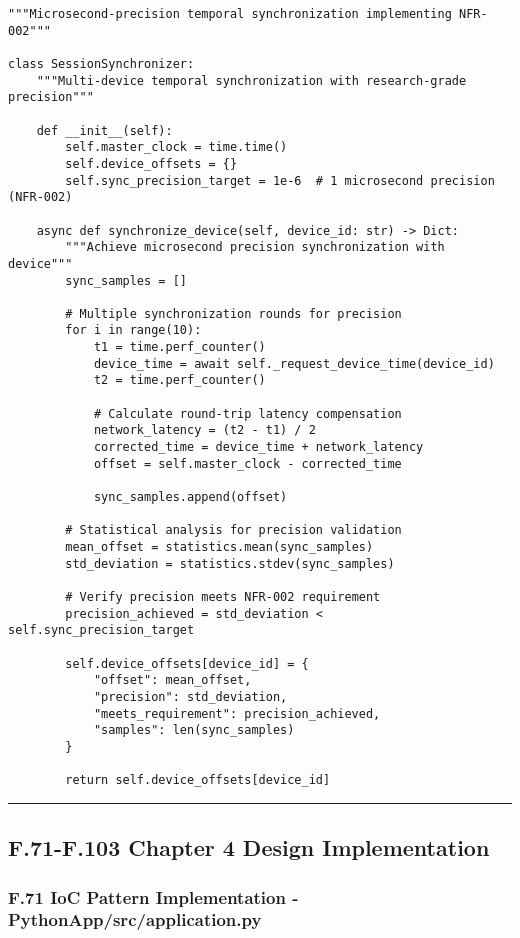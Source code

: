 \documentclass[12pt,a4paper]{article}
\begin{document}
{{\begin{verbatim}
"""Microsecond-precision temporal synchronization implementing NFR-002"""

class SessionSynchronizer:
    """Multi-device temporal synchronization with research-grade precision"""
    
    def __init__(self):
        self.master_clock = time.time()
        self.device_offsets = {}
        self.sync_precision_target = 1e-6  # 1 microsecond precision (NFR-002)
        
    async def synchronize_device(self, device_id: str) -> Dict:
        """Achieve microsecond precision synchronization with device"""
        sync_samples = []
        
        # Multiple synchronization rounds for precision
        for i in range(10):
            t1 = time.perf_counter()
            device_time = await self._request_device_time(device_id)
            t2 = time.perf_counter()
            
            # Calculate round-trip latency compensation
            network_latency = (t2 - t1) / 2
            corrected_time = device_time + network_latency
            offset = self.master_clock - corrected_time
            
            sync_samples.append(offset)
        
        # Statistical analysis for precision validation
        mean_offset = statistics.mean(sync_samples)
        std_deviation = statistics.stdev(sync_samples)
        
        # Verify precision meets NFR-002 requirement
        precision_achieved = std_deviation < self.sync_precision_target
        
        self.device_offsets[device_id] = {
            "offset": mean_offset,
            "precision": std_deviation,
            "meets_requirement": precision_achieved,
            "samples": len(sync_samples)
        }
        
        return self.device_offsets[device_id]
\end{verbatim}

\hrule

\subsection{F.71-F.103 Chapter 4 Design Implementation}

\subsubsection{F.71 IoC Pattern Implementation - PythonApp/src/application.py}

}}
\end{document}
